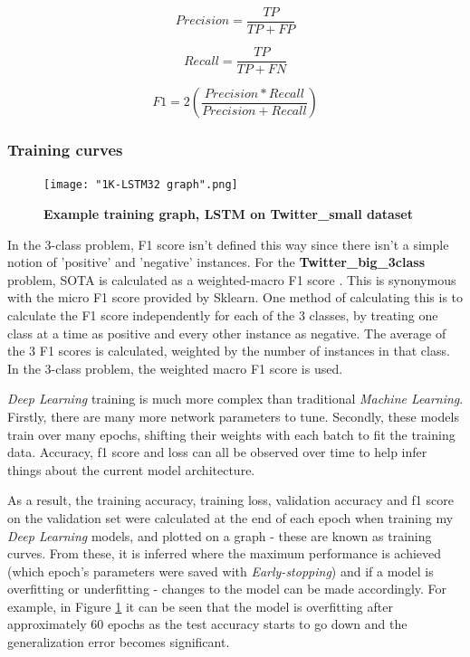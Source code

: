 \documentclass[12pt,a4paper]{article}
\begin{document}
\begin{multicols}{2}
	\begin{equation}
	{Precision = \frac{TP}{TP+FP} }
	\end{equation}
	
	\begin{equation}
	{Recall = \frac{TP}{TP+FN} }
	\end{equation}
	
	\begin{equation}
	{F1 = 2 ( \frac{Precision*Recall}{Precision+Recall} )}
	\end{equation}
\end{multicols}

\subsubsection{Training curves}
\begin{figure}
	\centering
	\texttt{[image: "1K-LSTM32 graph".png]}
	\caption{\textbf{Example training graph, LSTM on \textbf{Twitter\_small} dataset}}
	\label{training}
\end{figure}

In the 3-class problem, F1 score isn't defined this way since there isn't a simple notion of 'positive' and 'negative' instances. For the \textbf{Twitter\_big\_3class} problem, SOTA is calculated as a weighted-macro F1 score \cite{Badjatiya}. This is synonymous with the micro F1 score provided by Sklearn. One method of calculating this is to calculate the F1 score independently for each of the 3 classes, by treating one class at a time as positive and every other instance as negative. The average of the 3 F1 scores is calculated, weighted by the number of instances in that class. In the 3-class problem, the weighted macro F1 score is used.

\textit{Deep Learning} training is much more complex than traditional \textit{Machine Learning}. Firstly, there are many more network parameters to tune. Secondly, these models train over many epochs, shifting their weights with each batch to fit the training data. Accuracy, f1 score and loss can all be observed over time to help infer things about the current model architecture.

As a result, the training accuracy, training loss, validation accuracy  and f1 score on the validation set were calculated at the end of each epoch when training my \textit{Deep Learning} models, and plotted on a graph - these are known as training curves. From these, it is inferred where the maximum performance is achieved (which epoch's parameters were saved with \textit{Early-stopping}) and if a model is overfitting or underfitting - changes to the model can be made accordingly. For example, in Figure \ref{training} it can be seen that the model is overfitting after approximately 60 epochs as the test accuracy starts to go down and the generalization error becomes significant.
\end{document}
